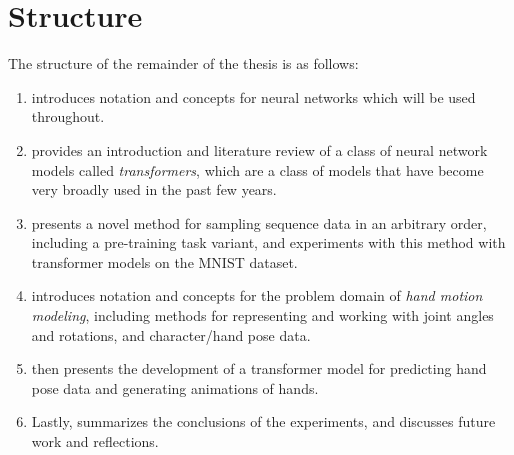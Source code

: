 \section{Structure}

The structure of the remainder of the thesis is as follows:

\begin{enumerate}
    \item {} introduces notation and concepts for neural networks which will be used throughout.

    \item {} provides an introduction and literature review of a class of neural network models called \textit{transformers}, which are a class of models that have become very broadly used in the past few years.

    \item {} presents a novel method for sampling sequence data in an arbitrary order, including a pre-training task variant, and experiments with this method with transformer models on the MNIST dataset.

    \item {} introduces notation and concepts for the problem domain of \textit{hand motion modeling}, including methods for representing and working with joint angles and rotations, and character/hand pose data.

    \item {} then presents the development of a transformer model for predicting hand pose data and generating animations of hands.

    \item Lastly,  summarizes the conclusions of the experiments, and discusses future work and reflections.
\end{enumerate}
